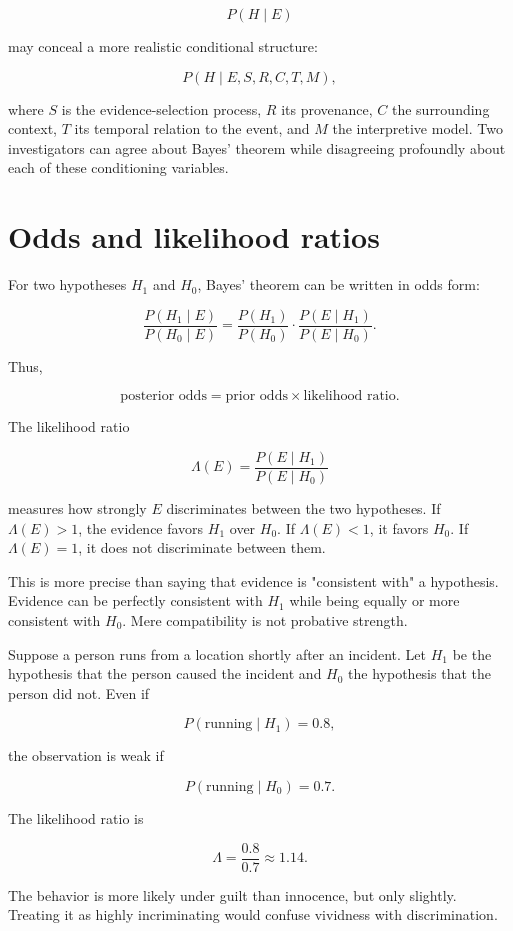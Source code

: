 \[
P(H\mid E)
\]

may conceal a more realistic conditional structure:

\[
P(H
\mid
E,
S,
R,
C,
T,
M),
\]

where \(S\) is the evidence-selection process, \(R\) its provenance, \(C\) the surrounding context, \(T\) its temporal relation to the event, and \(M\) the interpretive model. Two investigators can agree about Bayes' theorem while disagreeing profoundly about each of these conditioning variables.

\section{Odds and likelihood ratios}
\label{sec:a6}

For two hypotheses \(H_1\) and \(H_0\), Bayes' theorem can be written in odds form:

\[
\frac{P(H_1\mid E)}{P(H_0\mid E)}
=
\frac{P(H_1)}{P(H_0)}
\cdot
\frac{P(E\mid H_1)}{P(E\mid H_0)}.
\]

Thus,

\[
\text{posterior odds}
=
\text{prior odds}
\times
\text{likelihood ratio}.
\]

The likelihood ratio

\[
\Lambda(E)
=
\frac{P(E\mid H_1)}{P(E\mid H_0)}
\]

measures how strongly \(E\) discriminates between the two hypotheses. If \(\Lambda(E)>1\), the evidence favors \(H_1\) over \(H_0\). If \(\Lambda(E)<1\), it favors \(H_0\). If \(\Lambda(E)=1\), it does not discriminate between them.

This is more precise than saying that evidence is "consistent with" a hypothesis. Evidence can be perfectly consistent with \(H_1\) while being equally or more consistent with \(H_0\). Mere compatibility is not probative strength.

Suppose a person runs from a location shortly after an incident. Let \(H_1\) be the hypothesis that the person caused the incident and \(H_0\) the hypothesis that the person did not. Even if

\[
P(\text{running}\mid H_1)=0.8,
\]

the observation is weak if

\[
P(\text{running}\mid H_0)=0.7.
\]

The likelihood ratio is

\[
\Lambda=\frac{0.8}{0.7}\approx1.14.
\]

The behavior is more likely under guilt than innocence, but only slightly. Treating it as highly incriminating would confuse vividness with discrimination.


